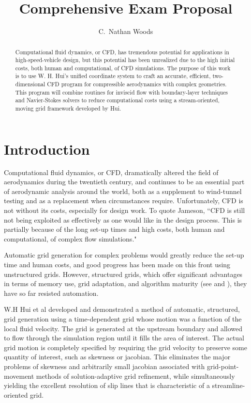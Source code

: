 \documentclass[12pt,letterpaper]{article}
\title{Comprehensive Exam Proposal}
\author{C.~Nathan Woods}
\begin{document}
\maketitle
\begin{abstract}
Computational fluid dynamics, or CFD, has tremendous potential for
applications in high-speed-vehicle design, but this potential has been
unrealized due to the high initial costs, both human and computational,
of CFD simulations. The purpose of this work is to use W. H. Hui's unified
coordinate system to craft an accurate, efficient, two-dimensional CFD
program for compressible aerodynamics with complex geometries. This
program will combine routines for inviscid flow with boundary-layer
techniques and Navier-Stokes solvers to reduce computational costs
using a stream-oriented, moving grid framework
developed by Hui.
\end{abstract}
\tableofcontents
\listoffigures
\printnomenclature
\section{Introduction}
Computational fluid dynamics, or CFD, dramatically altered the field
of aerodynamics during the twentieth century, and continues to be an
essential part of aerodynamic analysis around the world, both as a
supplement to wind-tunnel testing and as a replacement when
circumstances require. Unfortunately, CFD is not without its costs,
especially for design work. To quote Jameson, 
``CFD is still not being exploited as effectively as one 
would like in the design process. This is partially 
because of the long set-up times and high costs, both 
human and computational, of complex flow simulations."\cite{jameson97}

Automatic grid generation for complex problems
would greatly reduce the set-up time and human costs, and good
progress has been made on this front using unstructured
grids. However, structured grids, which offer significant advantages
in terms of memory use, grid adaptation, and algorithm maturity (see
\cite{steinthorsson95}\cite{boeing05}\cite{badcock00} and
\cite{IDAreview05}), they have so far resisted automation. 

W.H Hui et al developed and demonstrated a method of automatic,
structured, grid generation using a time-dependent grid whose motion
was a function of the local fluid velocity. 
The grid is generated at the upstream boundary and allowed to flow
through the simulation region until it fills the area of interest.
The actual grid motion is completely specified by
requiring the grid velocity to preserve some quantity of interest,
such as skewness or jacobian. This eliminates the major
problems of skewness and arbitrarily small
jacobian\cite{venkatakrishnan95} associated with grid-point-movement
methods of solution-adaptive grid refinement, while simultaneously
yielding the excellent resolution of slip lines that is characteristic
of a streamline-oriented grid.
\end{document}
